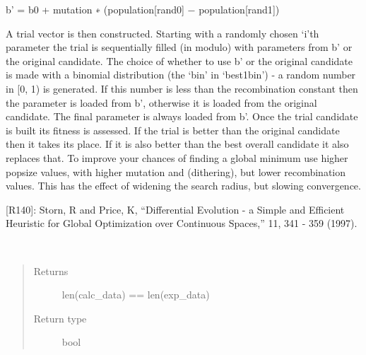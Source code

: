 \documentclass[letterpaper,10pt,english]{sphinxmanual}
\begin{document}
\begin{fulllineitems}
\begin{fulllineitems}
b’ = b0 + mutation ∗ (population{[}rand0{]} − population{[}rand1{]})

A trial vector is then constructed. Starting with a randomly chosen ‘i’th parameter
the trial is sequentially filled (in modulo) with parameters from b’ or the original
candidate. The choice of whether to use b’ or the original candidate is made
with a binomial distribution  (the ‘bin’ in ‘best1bin’) - a random number in {[}0, 1)
is generated. If this number is less than the recombination constant then the parameter
is loaded from b’, otherwise it is loaded from the original candidate. The final parameter
is always loaded from b’. Once the trial candidate is built its fitness is assessed.
If the trial is better than the original candidate then it takes its place.
If it is also better than the best overall candidate it also replaces that.
To improve your chances of finding a global minimum use higher popsize values,
with higher mutation and (dithering), but lower recombination values.
This has the effect of widening the search radius, but slowing convergence.

{[}R140{]}: Storn, R and Price, K, ``Differential Evolution - a Simple and Efficient Heuristic for Global                     Optimization over Continuous Spaces,''  11, 341 - 359 (1997).

\end{fulllineitems}


\begin{fulllineitems}
\label{\detokenize{rst/pairdistributionfunction:mstack.pairdistributionfunction.PdfRefinement.dim_check}}~\begin{quote}\begin{description}
\item[{Returns}] \leavevmode
len(calc\_data) == len(exp\_data)

\item[{Return type}] \leavevmode
bool

\end{description}\end{quote}

\end{fulllineitems}



\end{fulllineitems}
\end{document}
